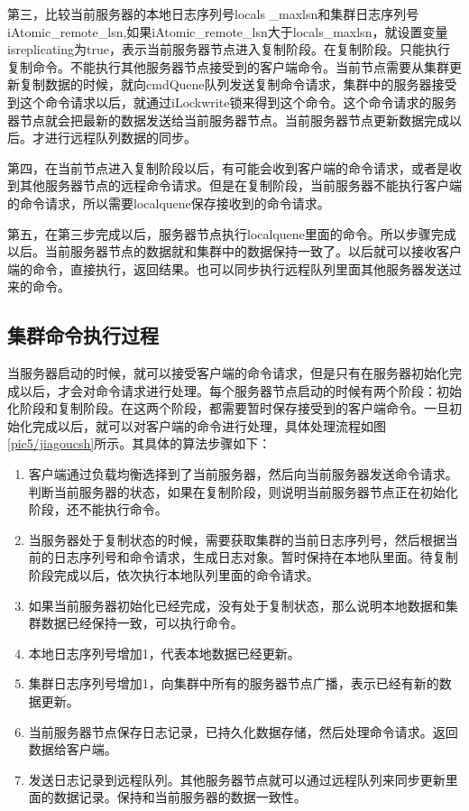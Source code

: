 第三，比较当前服务器的本地日志序列号locals
\_maxlsn和集群日志序列号iAtomic\_remote\_lsn,如果iAtomic\_remote\_lsn大于locals\_maxlsn，就设置变量isreplicating为true，表示当前服务器节点进入复制阶段。在复制阶段。只能执行复制命令。不能执行其他服务器节点接受到的客户端命令。当前节点需要从集群更新复制数据的时候，就向cmdQuene队列发送复制命令请求，集群中的服务器接受到这个命令请求以后，就通过iLockwrite锁来得到这个命令。这个命令请求的服务器节点就会把最新的数据发送给当前服务器节点。当前服务器节点更新数据完成以后。才进行远程队列数据的同步。

第四，在当前节点进入复制阶段以后，有可能会收到客户端的命令请求，或者是收到其他服务器节点的远程命令请求。但是在复制阶段，当前服务器不能执行客户端的命令请求，所以需要localquene保存接收到的命令请求。

第五，在第三步完成以后，服务器节点执行localquene里面的命令。所以步骤完成以后。当前服务器节点的数据就和集群中的数据保持一致了。以后就可以接收客户端的命令，直接执行，返回结果。也可以同步执行远程队列里面其他服务器发送过来的命令。
\subsection{集群命令执行过程}
当服务器启动的时候，就可以接受客户端的命令请求，但是只有在服务器初始化完成以后，才会对命令请求进行处理。每个服务器节点启动的时候有两个阶段：初始化阶段和复制阶段。在这两个阶段，都需要暂时保存接受到的客户端命令。一旦初始化完成以后，就可以对客户端的命令进行处理，具体处理流程如图\ref{pic5/jiagoucsh}所示。其具体的算法步骤如下：

\begin{enumerate}[fullwidth,itemindent=2em]
	\item 客户端通过负载均衡选择到了当前服务器，然后向当前服务器发送命令请求。判断当前服务器的状态，如果在复制阶段，则说明当前服务器节点正在初始化阶段，还不能执行命令。
	\item 当服务器处于复制状态的时候，需要获取集群的当前日志序列号，然后根据当前的日志序列号和命令请求，生成日志对象。暂时保持在本地队里面。待复制阶段完成以后，依次执行本地队列里面的命令请求。
	\item 如果当前服务器初始化已经完成，没有处于复制状态，那么说明本地数据和集群数据已经保持一致，可以执行命令。
	\item 本地日志序列号增加1，代表本地数据已经更新。
	\item 集群日志序列号增加1，向集群中所有的服务器节点广播，表示已经有新的数据更新。
	\item 当前服务器节点保存日志记录，已持久化数据存储，然后处理命令请求。返回数据给客户端。
	\item 发送日志记录到远程队列。其他服务器节点就可以通过远程队列来同步更新里面的数据记录。保持和当前服务器的数据一致性。
\end{enumerate}
